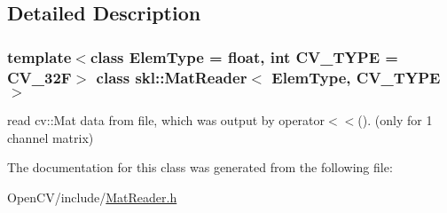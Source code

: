\subsection{Detailed Description}
\subsubsection*{template$<$class Elem\+Type = float, int C\+V\+\_\+\+T\+Y\+PE = C\+V\+\_\+32F$>$\newline
class skl\+::\+Mat\+Reader$<$ Elem\+Type, C\+V\+\_\+\+T\+Y\+P\+E $>$}

read cv\+::\+Mat data from file, which was output by operator$<$$<$(). (only for 1 channel matrix) 

The documentation for this class was generated from the following file\+:\begin{DoxyCompactItemize}
\item 
Open\+C\+V/include/\hyperlink{_mat_reader_8h}{Mat\+Reader.\+h}\end{DoxyCompactItemize}
